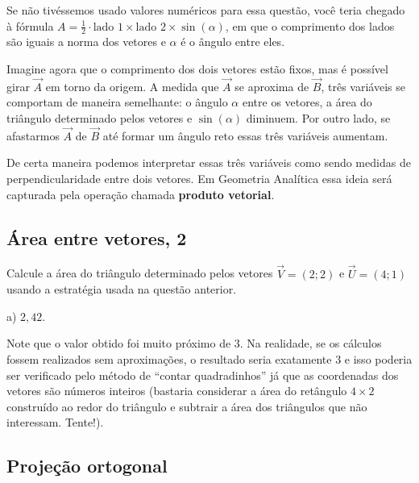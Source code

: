 \documentclass[main.tex]{subfiles}
\begin{document}
Se não tivéssemos usado valores numéricos para essa questão, você teria chegado à fórmula $A=\frac{1}{2} \cdot \text{lado 1} \times \text{lado 2} \times \sin(\alpha)$, em que o comprimento dos lados são iguais a norma dos vetores e $\alpha$ é o ângulo entre eles.

Imagine agora que o comprimento dos dois vetores estão fixos, mas é possível girar $\overrightarrow{A}$ em torno da origem. A medida que $\overrightarrow{A}$ se aproxima de $\overrightarrow{B}$, três variáveis se comportam de maneira semelhante: o ângulo $\alpha$ entre os vetores, a área do triângulo determinado pelos vetores e $\sin(\alpha)$ diminuem. Por outro lado, se afastarmos $\overrightarrow{A}$ de $\overrightarrow{B}$ até formar um ângulo reto essas três variáveis aumentam.

De certa maneira podemos interpretar essas três variáveis como sendo medidas de perpendicularidade entre dois vetores. Em Geometria Analítica essa ideia será capturada pela operação chamada \textbf{produto vetorial}.

\subsection*{Área entre vetores, 2}

\begin{questao}
Calcule a área do triângulo determinado pelos vetores $\overrightarrow{V}=(2;2)$ e $\overrightarrow{U}=(4;1)$ usando a estratégia usada na questão anterior.
\end{questao}

\begin{gabarito}
	\begin{gabaritoQuestao}
		a) $2,42$.
	\end{gabaritoQuestao}
\end{gabarito}

Note que o valor obtido foi muito próximo de 3. Na realidade, se os cálculos fossem realizados sem aproximações, o resultado seria exatamente 3 e isso poderia ser verificado pelo método de ``contar quadradinhos'' já que as coordenadas dos vetores são números inteiros (bastaria considerar a área do retângulo $4 \times 2$ construído ao redor do triângulo e subtrair a área dos triângulos que não interessam. Tente!).

\subsection*{Projeção ortogonal}
\end{document}
